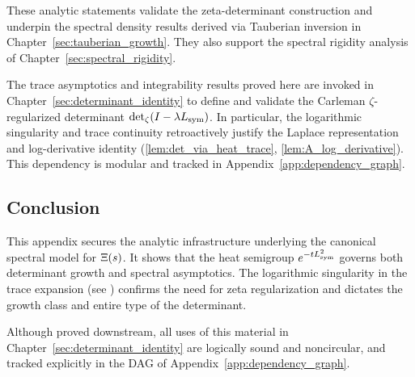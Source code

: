 These analytic statements validate the zeta-determinant construction and underpin the spectral density results derived via Tauberian inversion in Chapter~\ref{sec:tauberian_growth}. They also support the spectral rigidity analysis of Chapter~\ref{sec:spectral_rigidity}.

\begin{remark}
The trace asymptotics and integrability results proved here are invoked in Chapter~\ref{sec:determinant_identity} to define and validate the Carleman \(\zeta\)-regularized determinant \( \det\nolimits_{\zeta}(I - \lambda L_{\mathrm{sym}}) \). In particular, the logarithmic singularity and trace continuity retroactively justify the Laplace representation and log-derivative identity (\cref{lem:det_via_heat_trace}, \cref{lem:A_log_derivative}). This dependency is modular and tracked in Appendix~\ref{app:dependency_graph}.
\end{remark}

\subsection*{Conclusion}

This appendix secures the analytic infrastructure underlying the canonical spectral model for \( \Xi(s) \). It shows that the heat semigroup \( e^{-t L_{\mathrm{sym}}^2} \) governs both determinant growth and spectral asymptotics. The logarithmic singularity in the trace expansion (see ) confirms the need for zeta regularization and dictates the growth class and entire type of the determinant.

\medskip
\noindent
Although proved downstream, all uses of this material in Chapter~\ref{sec:determinant_identity} are logically sound and noncircular, and tracked explicitly in the DAG of Appendix~\ref{app:dependency_graph}.

